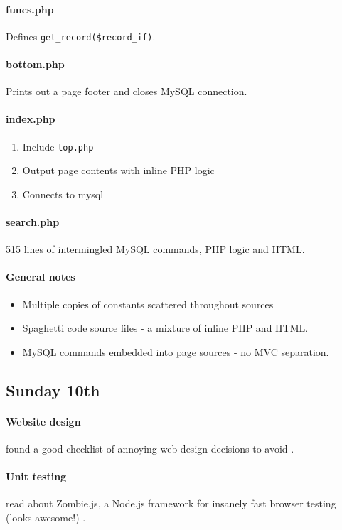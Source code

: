 \paragraph{funcs.php} Defines \texttt{get\_record(\$record\_if)}.

\paragraph{bottom.php} Prints out a page footer and closes MySQL connection.

\paragraph{index.php}
\begin{enumerate}
\item Include \texttt{top.php}
\item Output page contents with inline PHP logic
\item Connects to mysql
\end{enumerate}

\paragraph{search.php} 515 lines of intermingled MySQL commands, PHP logic and
HTML.

\paragraph{General notes}
\begin{itemize}
\item Multiple copies of constants scattered throughout sources
\item Spaghetti code source files - a mixture of inline PHP and HTML.
\item MySQL commands embedded into page sources - no MVC separation.
\end{itemize}

\subsection{Sunday 10th}
\paragraph{Website design} found a good checklist of annoying web design
decisions to avoid \cite{Saltman2013}.

\paragraph{Unit testing} read about Zombie.js, a Node.js framework for insanely
fast browser testing (looks awesome!) \cite{Loire2012}.

